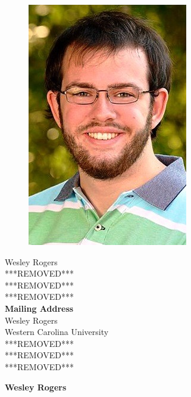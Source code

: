 \documentclass[a4paper,12pt,final]{memoir}
\newcommand{\Sep}{\vspace{1.5em}}
\newenvironment{AboutMe}
	{\ignorespaces\textbf{\color{RoyalBlue} About me}}
	{\Sep\ignorespacesafterend}
\begin{document}
\begin{figure}
	\hfill
	\includegraphics[width=0.75\columnwidth]{photo.png}
	\vspace{-7cm}
\end{figure}

\begin{flushright}\small
	Wesley Rogers \\
	***REMOVED*** \\
	***REMOVED*** \\
	***REMOVED*** \\
	\Sep
	\textbf{Mailing Address} \\
	Wesley Rogers \\
	Western Carolina University \\
	***REMOVED***\\
	***REMOVED*** \\
	***REMOVED*** \\
\end{flushright}\normalsize
\framebreak


\Huge\bfseries {\color{RoyalBlue} Wesley Rogers} \\
\normalsize\normalfont
\end{document}
